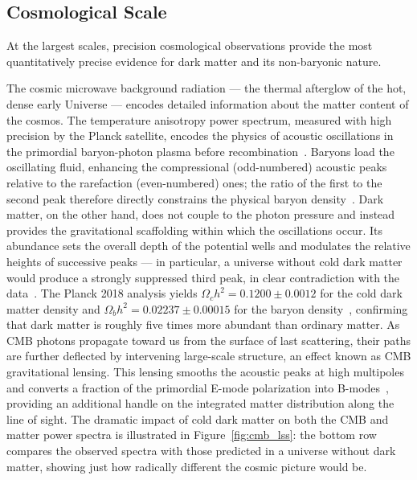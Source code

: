 \subsection{Cosmological Scale}
\label{sec:1.1.3}

At the largest scales, precision cosmological observations provide the most quantitatively precise evidence for dark matter and its non-baryonic nature.

The cosmic microwave background radiation --- the thermal afterglow of the hot, dense early Universe --- encodes detailed information about the matter content of the cosmos.
The temperature anisotropy power spectrum, measured with high precision by the Planck satellite, encodes the physics of acoustic oscillations in the primordial baryon-photon plasma before recombination~\cite{Aghanim:2018eyx,Cirelli:2024ssz}.
Baryons load the oscillating fluid, enhancing the compressional (odd-numbered) acoustic peaks relative to the rarefaction (even-numbered) ones; the ratio of the first to the second peak therefore directly constrains the physical baryon density~\cite{Cirelli:2024ssz}.
Dark matter, on the other hand, does not couple to the photon pressure and instead provides the gravitational scaffolding within which the oscillations occur.
Its abundance sets the overall depth of the potential wells and modulates the relative heights of successive peaks --- in particular, a universe without cold dark matter would produce a strongly suppressed third peak, in clear contradiction with the data~\cite{Cirelli:2024ssz}.
The Planck 2018 analysis yields $\Omega_c h^2 = 0.1200 \pm 0.0012$ for the cold dark matter density and $\Omega_b h^2 = 0.02237 \pm 0.00015$ for the baryon density~\cite{Aghanim:2018eyx}, confirming that dark matter is roughly five times more abundant than ordinary matter.
As CMB photons propagate toward us from the surface of last scattering, their paths are further deflected by intervening large-scale structure, an effect known as CMB gravitational lensing.
This lensing smooths the acoustic peaks at high multipoles and converts a fraction of the primordial E-mode polarization into B-modes~\cite{Cirelli:2024ssz,Planck:2018lbu}, providing an additional handle on the integrated matter distribution along the line of sight.
The dramatic impact of cold dark matter on both the CMB and matter power spectra is illustrated in Figure~\ref{fig:cmb_lss}: the bottom row compares the observed spectra with those predicted in a universe without dark matter, showing just how radically different the cosmic picture would be.

